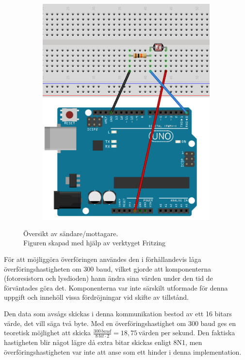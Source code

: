 \begin{figure}
\begin{subfigure}[b]{0.35\textwidth}
                    \includegraphics[width=\textwidth]{res/img/resistor}    
                \end{subfigure}
            \caption[Översikt av sändare/mottagare]{Översikt av sändare/mottagare. \\\tiny{Figuren skapad med hjälp av verktyget Fritzing \cite{fritz}}}\label{fig:schema}
            \end{figure}

            För att möjliggöra överföringen användes den i förhållandevis låga överföringshastigheten om 300 baud, vilket gjorde att komponenterna (fotoresistorn och lysdioden) hann ändra sina värden under den tid de förväntades göra det. Komponenterna var inte särskilt utformade för denna uppgift och innehöll vissa fördröjningar vid skifte av tillstånd. \bigskip

            Den data som avsågs skickas i denna kommunikation bestod av ett 16 bitars värde, det vill säga två byte. Med en överföringshastighet om 300 baud ges en teoretisk möjlighet att skicka $\frac{300 \,\textit{baud}}{8 \, bit \cdot 2} = 18,75 \, \text{värden per sekund}$. Den faktiska hastigheten blir något lägre då extra bitar skickas enligt 8N1, men överföringshastigheten var inte att anse som ett hinder i denna implementation. \bigskip
            
